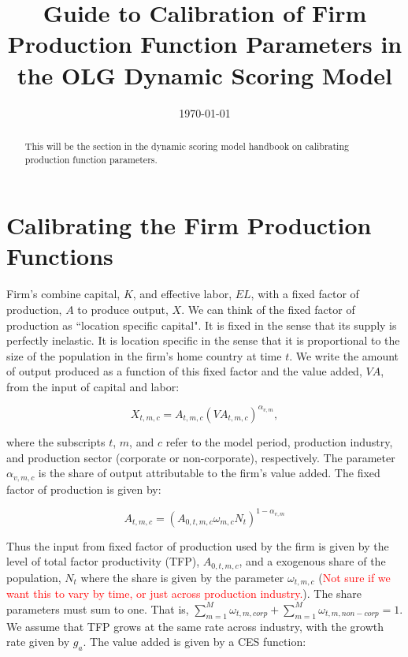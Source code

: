\documentclass[article,11pt,letterpaper,fleqn]{article}
\title{Guide to Calibration of Firm Production Function Parameters in the OLG Dynamic Scoring Model}
\date{\today}
\theoremstyle{definition}
\numberwithin{equation}{section}
\begin{document}

\maketitle



\begin{abstract}
This will be the section in the dynamic scoring model handbook on calibrating production function parameters.
\end{abstract}

\section{Calibrating the Firm Production Functions}

Firm's combine capital, $K$, and effective labor, $EL$, with a fixed factor of production, $A$ to produce output, $X$.  We can think of the fixed factor of production as ``location specific capital".  It is fixed in the sense that its supply is perfectly inelastic.  It is location specific in the sense that it is proportional to the size of the population in the firm's home country at time $t$.  We write the amount of output produced as a function of this fixed factor and the value added, $VA$, from the input of capital and labor:

\begin{equation}
X_{t,m,c} = A_{t,m,c}(VA_{t,m,c})^{\alpha_{v,m}},
\end{equation} 

\noindent\noindent where the subscripts $t$, $m$, and $c$ refer to the model period, production industry, and production sector (corporate or non-corporate), respectively.  The parameter $\alpha_{v,m,c}$ is the share of output attributable to the firm's value added. The fixed factor of production is given by:

\begin{equation}
A_{t,m,c} = (A_{0,t,m,c}\omega_{m,c}N_{t})^{1-\alpha_{v,m}}
\end{equation}

\noindent\noindent  Thus the input from fixed factor of production used by the firm is given by the level of total factor productivity (TFP), $A_{0,t,m,c}$, and a exogenous share of the population, $N_{t}$ where the share is given by the parameter $\omega_{t,m,c}$ (\textcolor{red}{Not sure if we want this to vary by time, or just across production industry.}).  The share parameters must sum to one.  That is, $\sum_{m=1}^{M} \omega_{t,m,corp} + \sum_{m=1}^{M} \omega_{t,m,non-corp}= 1$.     We assume that TFP grows at the same rate across industry, with the growth rate given by $g_{a}$.  The value added is given by a CES function:
\end{document}
